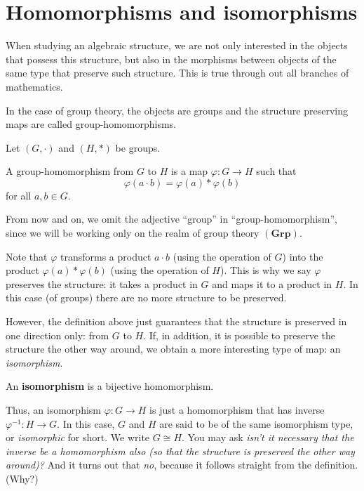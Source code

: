 \documentclass[11pt,a4paper]{article}
\begin{document}
\def\contador{Lesson 5}


\section{Homomorphisms and isomorphisms}

When studying an algebraic structure, we are not only interested in the objects that possess this structure, but also in the morphisms between objects of the same type that preserve such structure. 
This is true through out all branches of mathematics.

In the case of group theory, the objects are groups and  the structure preserving maps are called group-homomorphisms.

Let \((G,\cdot)\) and \((H, *) \) be groups.

\begin{defi}
    A group-homomorphism from \(G\) to \(H\) is a map \(\varphi \colon G\to H\) such that 
    \[\varphi(a\cdot b) = \varphi(a) * \varphi(b)\]
    for all \(a,b\in G\).
\end{defi}

\begin{rem}
    From now and on, we omit the adjective ``group'' in ``group-homomorphism'', since we will be working only on the realm of group theory \((\mathbf{Grp})\).
\end{rem}

Note that \(\varphi\) transforms a product \(a\cdot b\) (using the operation of \(G\))  into the   product \(\varphi(a)*\varphi(b)\) (using the operation of \(H\)).
This is why we say \(\varphi\) preserves the structure: it takes a product in \(G\) and maps it to a product in \(H\).
In this case (of groups) there are no more structure to be preserved.

However, the definition above just guarantees that the structure is preserved   in one direction only: from \(G\) to \(H\).
If, in addition, it is possible to preserve 
the structure the other way around, we obtain a more interesting type of map: an \textit{isomorphism}.

\begin{defi}
    An \textbf{isomorphism} is a bijective homomorphism.
\end{defi}

Thus, an isomorphism \(\varphi\colon G\to H\) is just a homomorphism that has   inverse \(\varphi^{-1}\colon H\to G\).
In this case, \(G\) and \(H\) are said to be of the same isomorphism type, or \textit{isomorphic} for short. We write \(G\cong H\).
You may ask \textit{isn't  it necessary that  the inverse   be a homomorphism also (so that the structure is preserved the other way around)?}
And it turns out that \textit{no}, because it follows straight from the definition. (Why?)
\end{document}
